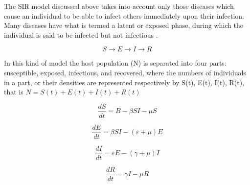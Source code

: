 The SIR model discussed above takes into account only those diseases which cause an individual to be able to infect others immediately upon their infection. Many diseases have what is termed a latent or exposed phase, during which the individual is said to be infected but not infectious \cite{bib9}.

\begin{equation}
S \rightarrow E \rightarrow I \rightarrow R
\end{equation}

In this kind of model the host population (N) is separated into four parts: susceptible, exposed, infectious, and recovered, where the numbers of individuals in a part, or their densities are represented respectively by S(t), E(t), I(t), R(t), that is $N = S(t) + E(t) + I(t) + R(t)$

\begin{equation}
\frac{dS}{dt} = B -\beta S I - \mu S
\end{equation}

\begin{equation}
\frac{dE}{dt} = \beta S I - (\varepsilon + \mu) E
\end{equation}

\begin{equation}
\frac{dI}{dt} = \varepsilon E - (\gamma + \mu) I
\end{equation}

\begin{equation}
\frac{dR}{dt} = \gamma I - \mu R
\end{equation}